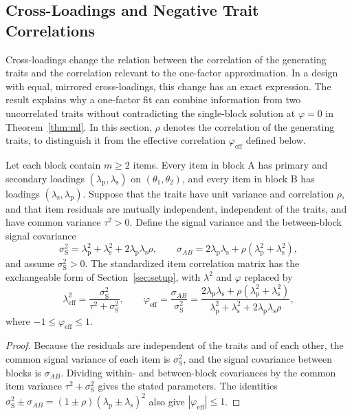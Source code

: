 \subsection{Cross-Loadings and Negative Trait Correlations}
\label{sec:crossloadings}

Cross-loadings change the relation between the correlation of the generating traits and the correlation relevant to the one-factor approximation. In a design with equal, mirrored cross-loadings, this change has an exact expression. The result explains why a one-factor fit can combine information from two uncorrelated traits without contradicting the single-block solution at $\varphi=0$ in Theorem~\ref{thm:ml}. In this section, $\rho$ denotes the correlation of the generating traits, to distinguish it from the effective correlation $\varphi_{\mathrm{eff}}$ defined below.

\begin{proposition}
\label{prop:crossloading}
Let each block contain $m\ge2$ items. Every item in block A has primary and secondary loadings $(\lambda_{\mathrm p},\lambda_{\mathrm s})$ on $(\theta_1,\theta_2)$, and every item in block B has loadings $(\lambda_{\mathrm s},\lambda_{\mathrm p})$. Suppose that the traits have unit variance and correlation $\rho$, and that item residuals are mutually independent, independent of the traits, and have common variance $\tau^2>0$. Define the signal variance and the between-block signal covariance
\[
\sigma_{\mathrm S}^2=\lambda_{\mathrm p}^2+\lambda_{\mathrm s}^2+2\lambda_{\mathrm p}\lambda_{\mathrm s}\rho,\qquad
\sigma_{AB}=2\lambda_{\mathrm p}\lambda_{\mathrm s}+\rho(\lambda_{\mathrm p}^2+\lambda_{\mathrm s}^2),
\]
and assume $\sigma_{\mathrm S}^2>0$. The standardized item correlation matrix has the exchangeable form of Section~\ref{sec:setup}, with $\lambda^2$ and $\varphi$ replaced by
\[
\lambda_{\mathrm{eff}}^2=\frac{\sigma_{\mathrm S}^2}{\tau^2+\sigma_{\mathrm S}^2},\qquad
\varphi_{\mathrm{eff}}=\frac{\sigma_{AB}}{\sigma_{\mathrm S}^2}
=\frac{2\lambda_{\mathrm p}\lambda_{\mathrm s}+\rho(\lambda_{\mathrm p}^2+\lambda_{\mathrm s}^2)}
{\lambda_{\mathrm p}^2+\lambda_{\mathrm s}^2+2\lambda_{\mathrm p}\lambda_{\mathrm s}\rho},
\]
where $-1\le\varphi_{\mathrm{eff}}\le1$.
\end{proposition}

\begin{proof}
Because the residuals are independent of the traits and of each other, the common signal variance of each item is $\sigma_{\mathrm S}^2$, and the signal covariance between blocks is $\sigma_{AB}$. Dividing within- and between-block covariances by the common item variance $\tau^2+\sigma_{\mathrm S}^2$ gives the stated parameters. The identities
$\sigma_{\mathrm S}^2\pm\sigma_{AB}=(1\pm\rho)(\lambda_{\mathrm p}\pm\lambda_{\mathrm s})^2$
also give $|\varphi_{\mathrm{eff}}|\le1$.
\end{proof}

